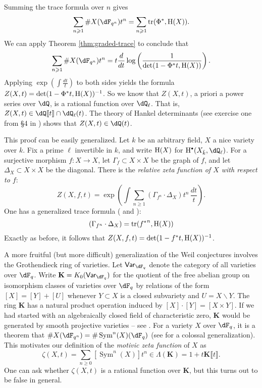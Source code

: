 Summing the trace formula over $n$ gives 
\[
  \sum_{n\geqslant 1} \# X(\dF_{q^n}) t^n = \sum_{n\geqslant 1} \trace({\Phi^\ast}, \h(X)) \text{.}
\]
We can apply Theorem \ref{thm:graded-trace} to conclude that 
\[
  \sum_{n\geqslant 1} \# X(\dF_{q^n}) t^n =  t\frac{d}{dt} \log\left(\frac{1}{\det(1-\Phi^\ast t, \h(X))}\right) \text{.}
\]
Applying $\exp\left(\int \frac{dt}{t}\right)$ to both sides yields the formula 
$Z(X,t) = \det(1-\Phi^\ast t,\operatorname{H}(X))^{-1}$. So we know that 
$Z(X,t)$, a priori a power series over $\dQ$, is a rational function over 
$\dQ_\ell$. That is, $Z(X,t)\in \dQ\llbracket t\rrbracket \cap \dQ_\ell(t)$. 
The theory of Hankel determinants (see exercise one from \S 4 in 
\cite[A.IV]{bo90}) shows that $Z(X,t)\in \dQ(t)$. 

This proof can be easily generalized. Let $k$ be an arbitrary field, $X$ a nice 
variety over $k$. Fix a prime $\ell$ invertible in $k$, and write 
$\operatorname{H}(X)$ for $\h^\bullet(X_{\bar k},\dQ_\ell)$. For a surjective morphism 
$f:X\to X$, let $\Gamma_f\subset X\times X$ be the graph of $f$, and let 
$\Delta_X\subset X\times X$ be the diagonal. There is the \emph{relative zeta 
function of $X$ with respect to $f$}: 
\[
  Z(X,f,t) = \exp\left(\int \sum_{n\geqslant 1} (\Gamma_{f^n}\cdot \Delta_X) t^n\,\frac{dt}{t}\right) \text{.}
\]
One has a generalized trace formula (\cite[ex.11]{dj-wc} and \cite[IV.3.3]{de77}):
\[
  (\Gamma_{f^n}\cdot \Delta_X) = \operatorname{tr}({f^\ast}^n, \operatorname{H}(X))
\]
Exactly as before, it follows that $Z(X,f,t) = \det(1-f^\ast t,\operatorname{H}(X))^{-1}$. 

A more fruitful (but more difficult) generalization of the Weil conjectures 
involves the Grothendieck ring of varieties. Let $\mathsf{Var}_{\dF_q}$ denote 
the category of all varieties over $\dF_q$. Write 
$\mathbf K=K_0(\mathsf{Var}_{\dF_q})$ for the quotient of the free abelian 
group on isomorphism classes of varieties over $\dF_q$ by relations of the 
form $[X]=[Y]+[U]$ whenever $Y\subset X$ is a closed subvariety and 
$U=X\smallsetminus Y$. The ring $\mathbf K$ has a natural product operation 
induced by $[X]\cdot [Y] = [X\times Y]$. If we had started with an 
algebraically closed field of characteristic zero, $\mathbf K$ would be 
generated by smooth projective varieties -- see \cite{bi04}.
For a variety $X$ over $\dF_q$, it is a theorem that 
$\# X(\dF_{q^n}) = \# \operatorname{Sym}^n(X)(\dF_q)$ (see 
\cite[III.2.11]{de77} for a colossal generalization). This motivates our 
definition of the \emph{motivic zeta function} of $X$ as 
\[
  \zeta(X,t) = \sum_{n\geqslant 0} [\operatorname{Sym}^n(X)] t^n \in \Lambda(\mathbf K) = 1+t\mathbf K\llbracket t\rrbracket \text{.}
\]
One can ask whether $\zeta(X,t)$ is a rational function over 
$\mathbf K$, but this turns out to be false in general. 





